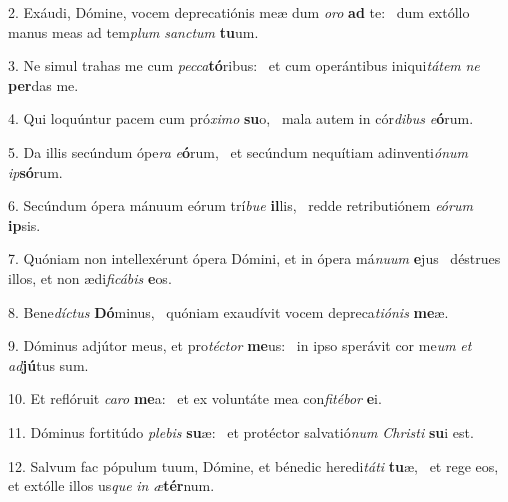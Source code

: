 2. Exáudi, Dómine, vocem deprecatiónis meæ dum \textit{o}\textit{ro} \textbf{ad} te: \ast\  dum extóllo manus meas ad tem\textit{plum} \textit{sanc}\textit{tum} \textbf{tu}um.\

3. Ne simul trahas me cum \textit{pec}\textit{ca}\textbf{tó}ribus: \ast\  et cum operántibus iniqui\textit{tá}\textit{tem} \textit{ne} \textbf{per}das me.\

4. Qui loquúntur pacem cum pró\textit{xi}\textit{mo} \textbf{su}o, \ast\  mala autem in cór\textit{di}\textit{bus} \textit{e}\textbf{ó}rum.\

5. Da illis secúndum ópe\textit{ra} \textit{e}\textbf{ó}rum, \ast\  et secúndum nequítiam adinventi\textit{ó}\textit{num} \textit{ip}\textbf{só}rum.\

6. Secúndum ópera mánuum eórum trí\textit{bu}\textit{e} \textbf{il}lis, \ast\  redde retributiónem \textit{e}\textit{ó}\textit{rum} \textbf{ip}sis.\

7. Quóniam non intellexérunt ópera Dómini, et in ópera má\textit{nu}\textit{um} \textbf{e}jus \ast\  déstrues illos, et non ædi\textit{fi}\textit{cá}\textit{bis} \textbf{e}os.\

8. Bene\textit{díc}\textit{tus} \textbf{Dó}minus, \ast\  quóniam exaudívit vocem depreca\textit{ti}\textit{ó}\textit{nis} \textbf{me}æ.\

9. Dóminus adjútor meus, et pro\textit{téc}\textit{tor} \textbf{me}us: \ast\  in ipso sperávit cor me\textit{um} \textit{et} \textit{ad}\textbf{jú}tus sum.\

10. Et reflóruit \textit{ca}\textit{ro} \textbf{me}a: \ast\  et ex voluntáte mea con\textit{fi}\textit{té}\textit{bor} \textbf{e}i.\

11. Dóminus fortitúdo \textit{ple}\textit{bis} \textbf{su}æ: \ast\  et protéctor salvatió\textit{num} \textit{Chris}\textit{ti} \textbf{su}i est.\

12. Salvum fac pópulum tuum, Dómine, et bénedic heredi\textit{tá}\textit{ti} \textbf{tu}æ, \ast\  et rege eos, et extólle illos us\textit{que} \textit{in} \textit{æ}\textbf{tér}num.\

